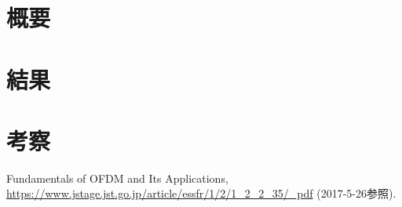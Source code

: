 \documentclass[a4paper,dvipdfmx]{jsarticle}%
\title {}
\author{佐田 悠生}
\date  {\today}
\begin{document}
\maketitle
\section{概要}

\section{結果}

\section{考察}

\begin{thebibliography}{9}
		Fundamentals of OFDM and Its Applications,
		{\small \url{https://www.jstage.jst.go.jp/article/essfr/1/2/1_2_2_35/_pdf}} (2017-5-26参照).
\end{thebibliography}
\end{document}
